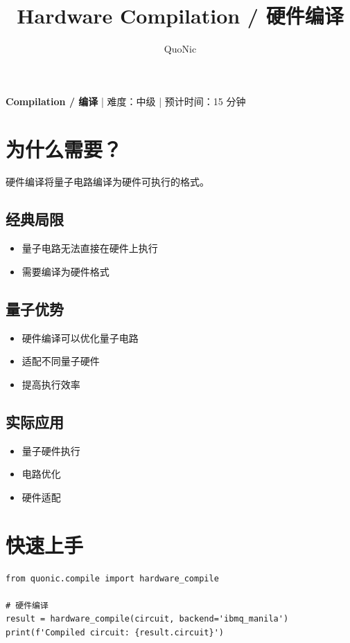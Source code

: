 \documentclass[12pt,a4paper]{article}
\title{Hardware Compilation / 硬件编译}
\author{QuoNic}
\date{}
\begin{document}
\maketitle

\begin{center}
\textbf{Compilation / 编译} | 难度：中级 | 预计时间：15 分钟
\end{center}

\tableofcontents
\newpage

\section{为什么需要？}

硬件编译将量子电路编译为硬件可执行的格式。

\subsection{经典局限}
\begin{itemize}
  \item 量子电路无法直接在硬件上执行
  \item 需要编译为硬件格式
\end{itemize}

\subsection{量子优势}
\begin{itemize}
  \item 硬件编译可以优化量子电路
  \item 适配不同量子硬件
  \item 提高执行效率
\end{itemize}

\subsection{实际应用}
\begin{itemize}
  \item 量子硬件执行
  \item 电路优化
  \item 硬件适配
\end{itemize}

\section{快速上手}

\begin{verbatim}
from quonic.compile import hardware_compile

# 硬件编译
result = hardware_compile(circuit, backend='ibmq_manila')
print(f'Compiled circuit: {result.circuit}')
\end{verbatim}
\end{document}
